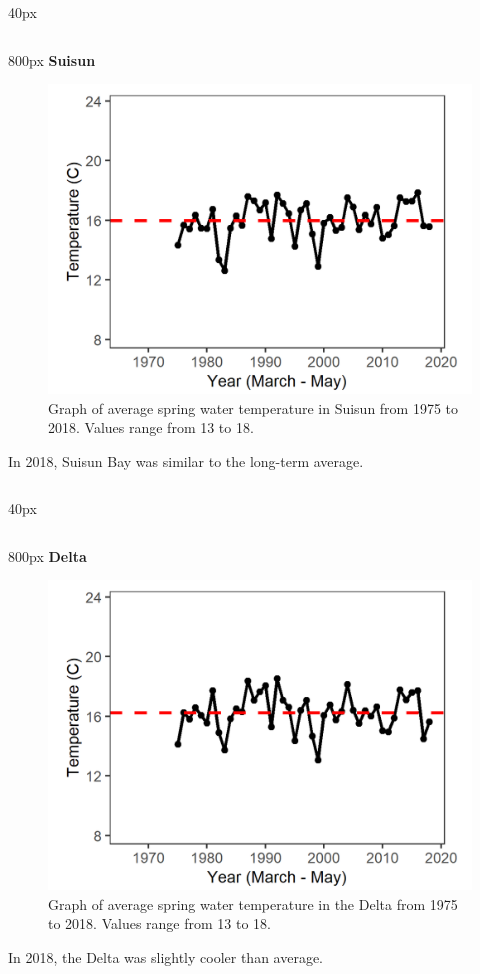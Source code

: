 \documentclass[
]{book}
\begin{document}
\begin{column}{40px\textwidth}
~
\end{column}

\begin{column}{800px\textwidth}
\textbf{Suisun}

\begin{figure}
\includegraphics[width=15.25in]{figures/temp_ssspring} \caption{Graph of average spring water temperature in Suisun from 1975 to 2018. Values range from 13 to 18.}\label{fig:unnamed-chunk-15}
\end{figure}

In 2018, Suisun Bay was similar to the long-term average.
\end{column}

\begin{column}{40px\textwidth}
~
\end{column}

\begin{column}{800px\textwidth}
\textbf{Delta}

\begin{figure}
\includegraphics[width=15.25in]{figures/temp_dtspring} \caption{Graph of average spring water temperature in the Delta from 1975 to 2018. Values range from 13 to 18.}\label{fig:unnamed-chunk-16}
\end{figure}

In 2018, the Delta was slightly cooler than average.
\end{column}
\end{document}
